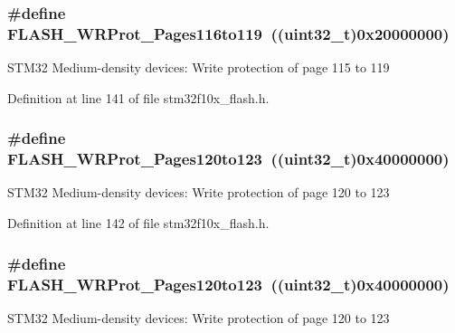 \subsubsection[{\texorpdfstring{F\+L\+A\+S\+H\+\_\+\+W\+R\+Prot\+\_\+\+Pages116to119}{FLASH_WRProt_Pages116to119}}]{\setlength{\rightskip}{0pt plus 5cm}\#define F\+L\+A\+S\+H\+\_\+\+W\+R\+Prot\+\_\+\+Pages116to119~(({\bf uint32\+\_\+t})0x20000000)}\hypertarget{group___option___bytes___write___protection_ga1283655c7c974e0de142cec7921c8673}{}\label{group___option___bytes___write___protection_ga1283655c7c974e0de142cec7921c8673}
S\+T\+M32 Medium-\/density devices\+: Write protection of page 115 to 119 

Definition at line 141 of file stm32f10x\+\_\+flash.\+h.

\subsubsection[{\texorpdfstring{F\+L\+A\+S\+H\+\_\+\+W\+R\+Prot\+\_\+\+Pages120to123}{FLASH_WRProt_Pages120to123}}]{\setlength{\rightskip}{0pt plus 5cm}\#define F\+L\+A\+S\+H\+\_\+\+W\+R\+Prot\+\_\+\+Pages120to123~(({\bf uint32\+\_\+t})0x40000000)}\hypertarget{group___option___bytes___write___protection_gac8d2f42123810fefc68572709d8830ec}{}\label{group___option___bytes___write___protection_gac8d2f42123810fefc68572709d8830ec}
S\+T\+M32 Medium-\/density devices\+: Write protection of page 120 to 123 

Definition at line 142 of file stm32f10x\+\_\+flash.\+h.

\subsubsection[{\texorpdfstring{F\+L\+A\+S\+H\+\_\+\+W\+R\+Prot\+\_\+\+Pages120to123}{FLASH_WRProt_Pages120to123}}]{\setlength{\rightskip}{0pt plus 5cm}\#define F\+L\+A\+S\+H\+\_\+\+W\+R\+Prot\+\_\+\+Pages120to123~(({\bf uint32\+\_\+t})0x40000000)}\hypertarget{group___option___bytes___write___protection_gac8d2f42123810fefc68572709d8830ec}{}\label{group___option___bytes___write___protection_gac8d2f42123810fefc68572709d8830ec}
S\+T\+M32 Medium-\/density devices\+: Write protection of page 120 to 123 

